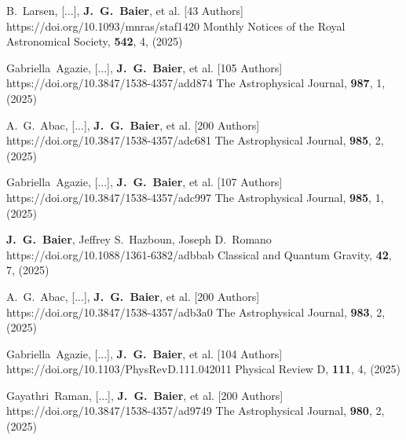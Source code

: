          {B.~{Larsen}, [...], \textbf{J.~G.~{Baier}}, et al. [43 Authors]}
         {https://doi.org/10.1093/mnras/staf1420}
         {{Monthly Notices of the Royal Astronomical Society}, \textbf{542}, 4, (2025)}

         {Gabriella~{Agazie}, [...], \textbf{J.~G.~{Baier}}, et al. [105 Authors]}
         {https://doi.org/10.3847/1538-4357/add874}
         {{The Astrophysical Journal}, \textbf{987}, 1, (2025)}

         {A.~G.~{Abac}, [...], \textbf{J.~G.~{Baier}}, et al. [200 Authors]}
         {https://doi.org/10.3847/1538-4357/adc681}
         {{The Astrophysical Journal}, \textbf{985}, 2, (2025)}

         {Gabriella~{Agazie}, [...], \textbf{J.~G.~{Baier}}, et al. [107 Authors]}
         {https://doi.org/10.3847/1538-4357/adc997}
         {{The Astrophysical Journal}, \textbf{985}, 1, (2025)}

         {\textbf{J.~G.~{Baier}}, Jeffrey S.~{Hazboun}, Joseph D.~{Romano}}
         {https://doi.org/10.1088/1361-6382/adbbab}
         {{Classical and Quantum Gravity}, \textbf{42}, 7, (2025)}

         {A.~G.~{Abac}, [...], \textbf{J.~G.~{Baier}}, et al. [200 Authors]}
         {https://doi.org/10.3847/1538-4357/adb3a0}
         {{The Astrophysical Journal}, \textbf{983}, 2, (2025)}

         {Gabriella~{Agazie}, [...], \textbf{J.~G.~{Baier}}, et al. [104 Authors]}
         {https://doi.org/10.1103/PhysRevD.111.042011}
         {{Physical Review D}, \textbf{111}, 4, (2025)}

         {Gayathri~{Raman}, [...], \textbf{J.~G.~{Baier}}, et al. [200 Authors]}
         {https://doi.org/10.3847/1538-4357/ad9749}
         {{The Astrophysical Journal}, \textbf{980}, 2, (2025)}

